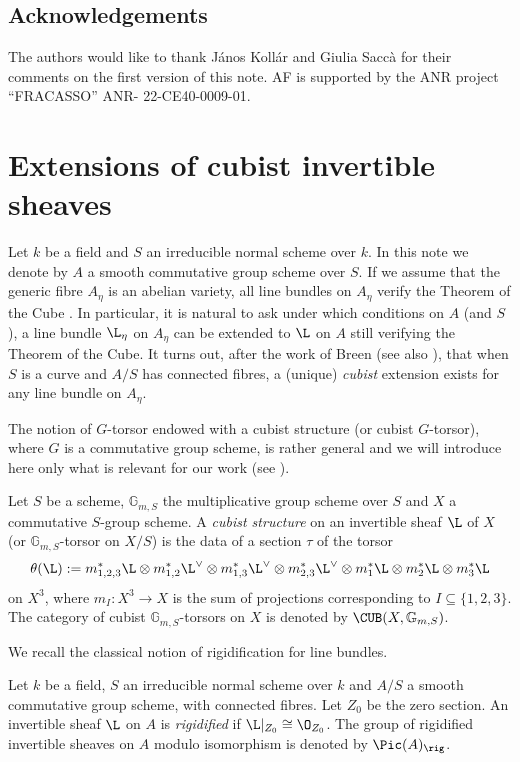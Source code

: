 \documentclass[12pt, english]{amsart}
\begin{document}
\subsection*{Acknowledgements} The  authors  would  like  to  thank  János Kollár and Giulia Saccà for their comments on the first version of this note. AF is supported by the ANR project ``FRACASSO''  ANR- 22-CE40-0009-01.


\section{Extensions of cubist invertible sheaves} \label{sec_cubist}
Let $k$ be a field and $S$ an irreducible normal scheme over $k$. In this note we denote by $A$ a smooth commutative group scheme over $S$. 
If we assume that the generic fibre $A_\eta$ is an abelian variety, all line bundles on $A_\eta$ verify the Theorem of the Cube \cite[Corollary~2, page 58]{M70}. In particular, it is natural to ask under which conditions on $A$ (and $S$), a line bundle $\L_\eta$ on $A_\eta$ can be extended to $\L$ on $A$ still verifying the Theorem of the Cube. It turns out, after the work of Breen \cite{B83} (see also \cite{M85}), that when $S$ is a curve and $A/S$ has connected fibres, a (unique) \emph{cubist} extension exists for any line bundle on $A_\eta$.  

The notion of $G$-torsor endowed with a cubist structure (or cubist $G$-torsor), where $G$ is a commutative group scheme, is rather general and we will introduce here only what is relevant for our work (see \cite[Ch.~I, Definition~2.4.5]{M85}).

\begin{definition}
Let $S$ be a scheme, $\mathbb{G}_{m,S}$ the multiplicative group scheme over $S$ and $X$ a commutative $S$-group scheme. A \emph{cubist structure} on an invertible sheaf $\L$ of $X$ (or $\mathbb{G}_{m,S}$-torsor on $X/S$) is the data of a section $\tau$ of the torsor
$$\theta(\L):= m_{1,2,3}^*\L \otimes m_{1,2}^*\L^\vee \otimes m_{1,3}^*\L^\vee \otimes m_{2,3}^*\L^\vee \otimes m_{1}^*\L \otimes m_{2}^*\L \otimes m_{3}^*\L$$
on $X^3$, where $m_I\colon X^3 \to X$ is the sum of projections corresponding to $I\subseteq \{1,2,3\}$.
The category of cubist $\mathbb{G}_{m,S}$-torsors on $X$ is denoted by $\CUB(X,\mathbb{G}_{m,S})$.
\end{definition}

We recall the classical notion of rigidification for line bundles.

\begin{definition}
Let $k$ be a field, $S$ an irreducible normal scheme over $k$ and $A/S$ a smooth commutative group scheme, with connected fibres. Let $Z_0$ be the zero section. An invertible sheaf $\L$ on $A$ is \emph{rigidified} if $\L|_{Z_0}\cong \O_{Z_0}$. The group of rigidified invertible sheaves on $A$ modulo isomorphism is denoted by $\Pic(A)_{\rig}$.
\end{definition}
\end{document}
